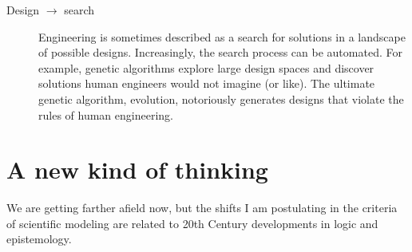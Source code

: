 \documentclass[12pt]{book}
\theoremstyle{exercise}
\begin{document}
\begin{description}

\item[Design $\rightarrow$ search] Engineering is sometimes described
  as a search for solutions in a landscape of possible designs.
  Increasingly, the search process can be automated.  For example,
  genetic algorithms explore large design spaces and discover
  solutions human engineers would not imagine (or like).  The ultimate
  genetic algorithm, evolution, notoriously generates designs that
  violate the rules of human engineering.


\end{description}


\section{A new kind of thinking}

We are getting farther afield now, but the shifts I am postulating
in the criteria of scientific modeling are related to 20th Century
developments in logic and epistemology.

\end{document}
